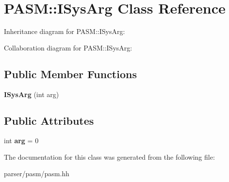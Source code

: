 \hypertarget{classPASM_1_1ISysArg}{}\section{P\+A\+SM\+:\+:I\+Sys\+Arg Class Reference}
\label{classPASM_1_1ISysArg}


Inheritance diagram for P\+A\+SM\+:\+:I\+Sys\+Arg\+:


Collaboration diagram for P\+A\+SM\+:\+:I\+Sys\+Arg\+:
\subsection*{Public Member Functions}
\begin{DoxyCompactItemize}
\item 
\mbox{\label{classPASM_1_1ISysArg_ad48f16bd49b0131051999cf8d8c9edd7}} 
{\bfseries I\+Sys\+Arg} (int arg)
\end{DoxyCompactItemize}
\subsection*{Public Attributes}
\begin{DoxyCompactItemize}
\item 
\mbox{\label{classPASM_1_1ISysArg_a8a368abec5c1d84523ce2d0dae179fab}} 
int {\bfseries arg} = 0
\end{DoxyCompactItemize}


The documentation for this class was generated from the following file\+:\begin{DoxyCompactItemize}
\item 
parser/pasm/pasm.\+hh\end{DoxyCompactItemize}
